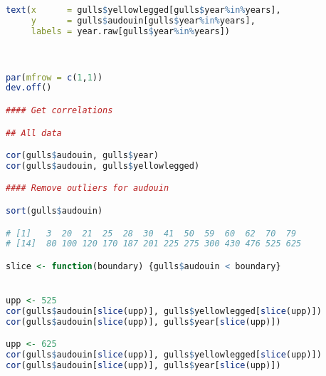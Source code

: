 \documentclass[11pt]{article}
\begin{document}
\begin{lstlisting}[language=R]
text(x      = gulls$yellowlegged[gulls$year%in%years], 
     y      = gulls$audouin[gulls$year%in%years], 
     labels = year.raw[gulls$year%in%years])



par(mfrow = c(1,1))
dev.off()

#### Get correlations 

## All data

cor(gulls$audouin, gulls$year)
cor(gulls$audouin, gulls$yellowlegged)

#### Remove outliers for audouin

sort(gulls$audouin)

# [1]   3  20  21  25  28  30  41  50  59  60  62  70  79
# [14]  80 100 120 170 187 201 225 275 300 430 476 525 625

slice <- function(boundary) {gulls$audouin < boundary}


upp <- 525
cor(gulls$audouin[slice(upp)], gulls$yellowlegged[slice(upp)])
cor(gulls$audouin[slice(upp)], gulls$year[slice(upp)])

upp <- 625
cor(gulls$audouin[slice(upp)], gulls$yellowlegged[slice(upp)])
cor(gulls$audouin[slice(upp)], gulls$year[slice(upp)])

\end{lstlisting}

\newpage
\end{document}
